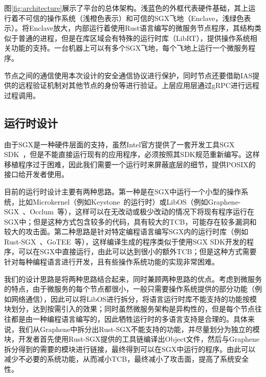 图\ref{fig:architecture}展示了平台的总体架构。浅蓝色的外框代表硬件基础，其上运行着不可信的操作系统（浅橙色表示）和可信的SGX飞地（Enclave，浅绿色表示）。将Enclave放大，内部运行着使用Rust语言编写的微服务节点程序，其结构类似于普通的进程，但是在库区域会有特殊的运行时库（LibRT），提供操作系统相关功能的支持。一台机器上可以有多个SGX飞地，每个飞地上运行一个微服务程序。

节点之间的通信使用本次设计的安全通信协议进行保护，同时节点还要借助IAS提供的远程验证机制对其他节点的身份等进行验证。上层应用层通过gRPC进行远程过程调用。

\subsection{运行时设计}

由于SGX是一种硬件层面的支持，虽然Intel官方提供了一套开发工具SGX SDK~\cite{costan2016intel}，但是不能直接运行现有的应用程序，必须按照其SDK规范重新编写。这样移植程序过于困难，因此我们需要一个运行时来屏蔽底层的细节，提供POSIX的接口给开发者使用。

目前的运行时设计主要有两种思路。第一种是在SGX中运行一个小型的操作系统，比如Microkernel（例如Keystone~\cite{lee2020keystone}的运行时）或LibOS（例如Graphene-SGX~\cite{tsai2017graphene}、Occlum~\cite{shen2020occlum}等），这样可以在无改动或极少改动的情况下将现有程序运行在SGX中；但是这种方式包含较多的代码，具有较大的TCB，可能存在较多漏洞和较大的攻击面。第二种思路是针对特定编程语言编写SGX内的运行时库（例如Rust-SGX~\cite{wang2019towards}、GoTEE~\cite{ghosn2019secured}等），这样编译生成的程序类似于使用SGX SDK开发的程序，可以在SGX中直接运行，由此可以达到很小的额外TCB；但是这种方式需要针对每种编程语言进行开发，且有些操作系统功能的实现非常困难。

我们的设计思路是将两种思路结合起来，同时兼顾两种思路的优点。考虑到微服务的特点，由于微服务的每个节点都很小，一般只需要操作系统提供的部分功能（例如网络通信），因此可以将LibOS进行拆分，将语言运行时库不能支持的功能按模块划分，达到按需引入的效果；同时虽然微服务架构是异构性的，但是每个节点往往都是由一种编程语言编写的，因此牺牲运行时的多语言支持是合理的。具体来说，我们从Graphene中拆分出Rust-SGX不能支持的功能，并尽量划分为独立的模块，开发者首先使用Rust-SGX提供的工具链编译出Object文件，然后与Graphene拆分得到的需要的模块进行链接，最终得到可以在SGX中运行的程序。由此可以减少不必要的系统功能，从而减小TCB，最终减小了攻击面，提高了系统安全性。

